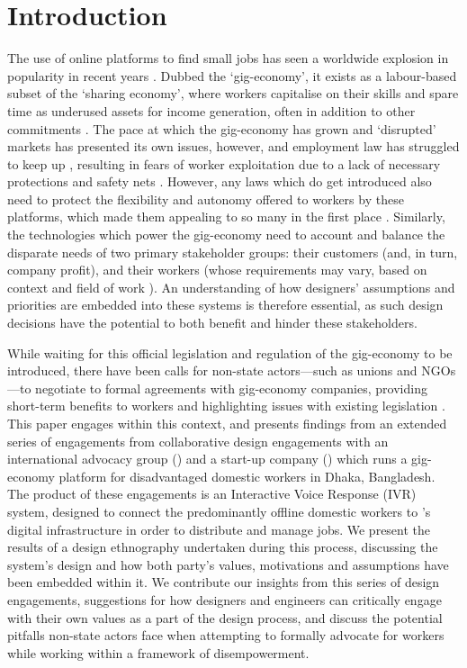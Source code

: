 \section{Introduction}

The use of online platforms to find small jobs has seen a worldwide explosion in popularity in recent years \cite{Taylor2017, islam2019, Wood2019}. Dubbed the `gig-economy', it exists as a labour-based subset of the `sharing economy', where workers capitalise on their skills and spare time as underused assets for income generation, often in addition to other commitments \cite{Balaram2017}. The pace at which the gig-economy has grown and `disrupted' markets has presented its own issues, however, and employment law has struggled to keep up \cite{Minter2017}, resulting in fears of worker exploitation due to a lack of necessary protections and safety nets \cite{Balaram2017}. However, any laws which do get introduced also need to protect the flexibility and autonomy offered to workers by these platforms, which made them appealing to so many in the first place \cite{Wood2019}. Similarly, the technologies which power the gig-economy need to account and balance the disparate needs of two primary stakeholder groups: their customers (and, in turn, company profit), and their workers (whose requirements may vary, based on context and field of work \cite{carlos2021}). An understanding of how designers' assumptions and priorities are embedded into these systems is therefore essential, as such design decisions have the potential to both benefit and hinder these stakeholders.

While waiting for this official legislation and regulation of the gig-economy to be introduced, there have been calls for non-state actors---such as unions and NGOs---to negotiate to formal agreements with gig-economy companies, providing short-term benefits to workers and highlighting issues with existing legislation \cite{Minter2017}. This paper engages within this context, and presents findings from an extended series of engagements from collaborative design engagements with an international advocacy group (\NGO{}) and a start-up company (\PC{}) which runs a gig-economy platform for disadvantaged domestic workers in Dhaka, Bangladesh. The product of these engagements is an Interactive Voice Response (IVR) system, designed to connect the predominantly offline domestic workers to \PC{}'s digital infrastructure in order to distribute and manage jobs. We present the results of a design ethnography undertaken during this process, discussing the system's design and how both party's values, motivations and assumptions have been embedded within it. We contribute our insights from this series of design engagements, suggestions for how designers and engineers can critically engage with their own values as a part of the design process, and discuss the potential pitfalls non-state actors face when attempting to formally advocate for workers while working within a framework of disempowerment.